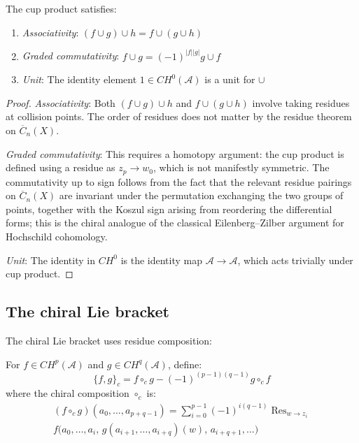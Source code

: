 \begin{proposition}
\label{prop:cup-product-properties}
The cup product satisfies:
\begin{enumerate}
\item \emph{Associativity}: $(f \cup g) \cup h = f \cup (g \cup h)$
\item \emph{Graded commutativity}: $f \cup g = (-1)^{|f||g|} g \cup f$
\item \emph{Unit}: The identity element $1 \in CH^0(\mathcal{A})$ is a unit for $\cup$
\end{enumerate}
\end{proposition}

\begin{proof}
\emph{Associativity}: Both $(f \cup g) \cup h$ and $f \cup (g \cup h)$ involve taking residues at collision points. The order of residues does not matter by the residue theorem on $\overline{C}_{n}(X)$.

\emph{Graded commutativity}: This requires a homotopy argument: the cup product is defined using a residue as $z_p \to w_0$, which is not manifestly symmetric. The commutativity up to sign follows from the fact that the relevant residue pairings on $\overline{C}_n(X)$ are invariant under the permutation exchanging the two groups of points, together with the Koszul sign arising from reordering the differential forms; this is the chiral analogue of the classical Eilenberg--Zilber argument for Hochschild cohomology.

\emph{Unit}: The identity in $CH^0$ is the identity map $\mathcal{A} \to \mathcal{A}$, which acts trivially under cup product. \qedhere
\end{proof}

\subsection{The chiral Lie bracket}

The chiral Lie bracket uses residue composition:

\begin{definition}
For $f \in CH^p(\mathcal{A})$ and $g \in CH^q(\mathcal{A})$, define:
\[
\{f, g\}_c = f \circ_c g - (-1)^{(p-1)(q-1)} g \circ_c f
\]
where the chiral composition $\circ_c$ is:
\begin{multline}
(f \circ_c g)(a_0, \ldots, a_{p+q-1})
= \sum_{i=0}^{p-1} (-1)^{i(q-1)}
\operatorname{Res}_{w \to z_i}\\
f\bigl(a_0, \ldots, a_i,\, g(a_{i+1}, \ldots, a_{i+q})(w),\,
a_{i+q+1}, \ldots\bigr)
\end{multline}
\end{definition}

